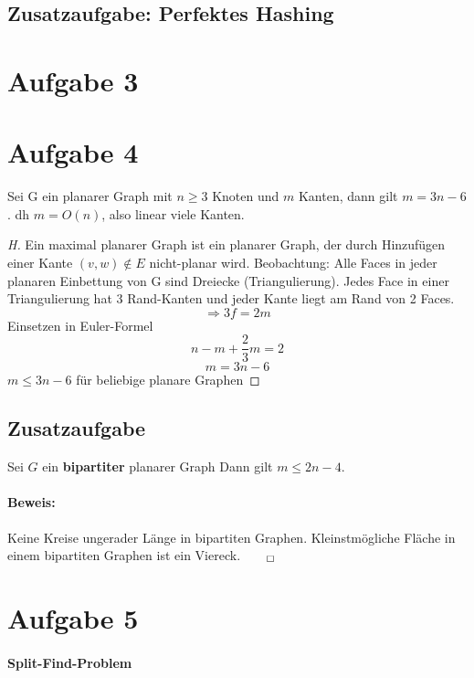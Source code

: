 \documentclass[10pt,a4paper]{article}
\begin{document}
\subsection*{Zusatzaufgabe: Perfektes Hashing}

\section*{Aufgabe 3}


\section*{Aufgabe 4}
	Sei G ein planarer Graph mit $ n \geq 3 $ Knoten und $m$ Kanten, dann gilt $ m = 3n-6 $. dh $ m=O(n) $, also linear viele Kanten.
	\begin{proof}[H]
		Ein maximal planarer Graph ist ein planarer Graph, der durch Hinzufügen einer Kante $ (v,w) \notin E $ nicht-planar wird. Beobachtung: Alle Faces in jeder planaren Einbettung von G sind Dreiecke (Triangulierung). Jedes Face in einer Triangulierung hat 3 Rand-Kanten und jeder Kante liegt am Rand von 2 Faces. 
		$$\Rightarrow 3f = 2m $$
		Einsetzen in Euler-Formel
		$$ n - m + \frac{2}{3}m = 2$$
		$$ m = 3n-6$$
		$ m \leq 3n-6 $ für beliebige planare Graphen
	\end{proof}

\subsection*{Zusatzaufgabe}
Sei $G$ ein \textbf{bipartiter} planarer Graph Dann gilt $ m \leq 2n-4 $. 

\paragraph{Beweis:} Keine Kreise ungerader Länge in bipartiten Graphen. Kleinstmögliche Fläche in einem bipartiten Graphen ist ein Viereck.$_{\qed}$


\section*{Aufgabe 5}
\paragraph{Split-Find-Problem}
\end{document}
